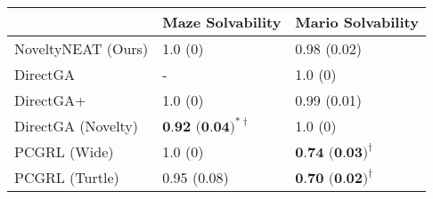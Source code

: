 \begin{tabular}{lll}
\toprule
{} & \multicolumn{1}{c}{Maze Solvability} & \multicolumn{1}{c}{Mario  Solvability}\\
\midrule
NoveltyNEAT (Ours) &                            1.0 (0) &                       0.98 (0.02) \\
DirectGA           &                                  - &                           1.0 (0) \\
DirectGA+          &                            1.0 (0) &                       0.99 (0.01) \\
DirectGA (Novelty) &  $\textbf{0.92 (0.04)}^{*\dagger}$ &                           1.0 (0) \\
PCGRL (Wide)       &                            1.0 (0) &  $\textbf{0.74 (0.03)}^{\dagger}$ \\
PCGRL (Turtle)     &                        0.95 (0.08) &  $\textbf{0.70 (0.02)}^{\dagger}$ \\
\bottomrule
\end{tabular}

